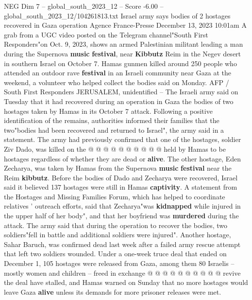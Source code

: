 \begin{textsample}{NEG Dim 7 – global\_south\_2023\_12 – Score -6.00 – global\_south\_2023\_12/104261813.txt}  \label{ex:f7_neg_415}
Israel army says bodies of 2 hostages recovered in Gaza operation Agence France-Presse December 13, 2023 10:01am A grab from a UGC video posted on the Telegram channel"South First Responders"on Oct. 9, 2023, shows an armed Palestinian militant leading a man during the Supernova \textbf{music} \textbf{festival}, near \textbf{Kibbutz} Reim in the Negev desert in southern Israel on October 7.
Hamas gunmen killed around 250 people who attended an outdoor rave \textbf{festival} in an Israeli community near Gaza at the weekend, a volunteer who helped collect the bodies said on Monday.
AFP / South First Responders JERUSALEM, unidentified -- The Israeli army said on Tuesday that it had recovered during an operation in Gaza the bodies of two hostages taken by Hamas in its October 7 attack.
Following a positive identification of the remains, authorities informed their families that the two"bodies had been recovered and returned to Israel", the army said in a statement.
The army had previously confirmed that one of the hostages, soldier Ziv Dado, was killed on the @ @ @ @ @ @ @ @ @ @ held by Hamas to be hostages regardless of whether they are dead or \textbf{alive}.
The other hostage, Eden Zecharya, was taken by Hamas from the Supernova \textbf{music} \textbf{festival} near the Reim \textbf{kibbutz}.
Before the bodies of Dado and Zecharya were recovered, Israel said it believed 137 hostages were still in Hamas \textbf{captivity}.
A statement from the Hostages and Missing Families Forum, which has helped to coordinate relatives ' outreach efforts, said that Zecharya"was \textbf{kidnapped} while injured in the upper half of her body", and that her boyfriend was \textbf{murdered} during the attack.
The army said that during the operation to recover the bodies, two soldiers"fell in battle and additional soldiers were injured".
Another hostage, Sahar Baruch, was confirmed dead last week after a failed army rescue attempt that left two soldiers wounded.
Under a one-week truce deal that ended on December 1, 105 hostages were released from Gaza, among them 80 Israelis -- mostly women and children -- freed in exchange @ @ @ @ @ @ @ @ @ @ revive the deal have stalled, and Hamas warned on Sunday that no more hostages would leave Gaza \textbf{alive} unless its demands for more prisoner releases were met.

\end{textsample}
